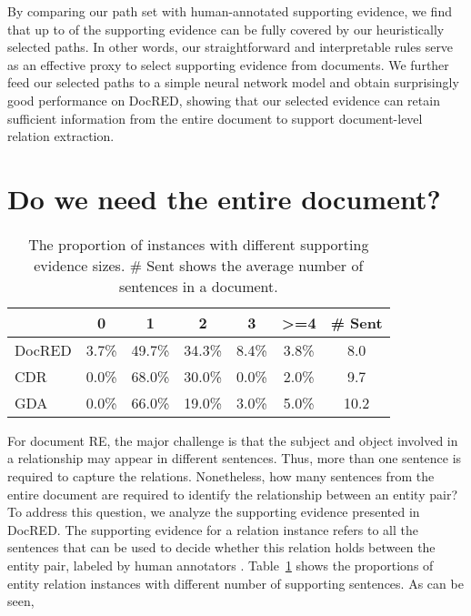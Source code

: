 \documentclass[11pt,a4paper]{article}
\begin{document}
By comparing our path set with human-annotated supporting evidence, we find that up to  of the supporting evidence can be fully covered by our heuristically selected paths. In other words, our straightforward and interpretable rules serve as an effective proxy to select supporting evidence from documents. We further feed our selected paths to a simple neural network model and obtain surprisingly good performance on DocRED, showing that our selected evidence can retain sufficient information from the entire document to support document-level relation extraction. 

\section{Do we need the entire document?}
\label{sec:do_we}

\begin{table}[]
\centering
\setlength{\tabcolsep}{4pt}
\small
\begin{tabular}{lccccc|c}
\toprule
          & 0     & 1                          & 2      & 3     & \textgreater{}=4 & \# Sent \\ \midrule
DocRED     & 3.7\% & \multicolumn{1}{c}{49.7\%} & 34.3\% & 8.4\% & 3.8\%            & 8.0       \\ \midrule
CDR  & 0.0\% & \multicolumn{1}{c}{68.0\%} & 30.0\% & 0.0\% & 2.0\%            & 9.7       \\
GDA  & 0.0\% & 66.0\%                     & 19.0\% & 3.0\% & 5.0\%            & 10.2      \\ \bottomrule
\end{tabular}

\caption{The proportion of instances with different supporting evidence sizes. \# Sent shows the average number of sentences in a document.}
\label{tab:size_of_supporting_evidence}
\vspace{-0.25cm}
\end{table}
 
For document RE, the major challenge is that the subject and object involved in a relationship may appear in different sentences. Thus, more than one sentence is required to capture the relations. 
Nonetheless, how many sentences from the entire document are required to identify the relationship between an entity pair? To address this question, we analyze the supporting evidence presented in DocRED. 
The supporting evidence for a relation instance refers to all the sentences that can be used to decide whether this relation holds between the entity pair,  labeled by human annotators \cite{yao_docred_2019}. 
Table~\ref{tab:size_of_supporting_evidence} shows the proportions of entity relation instances with different number of supporting sentences. As can be seen, 
\end{document}
